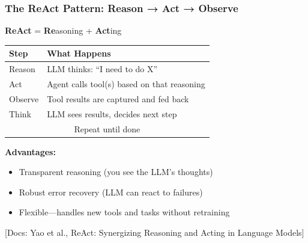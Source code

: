 \documentclass[aspectratio=169,11pt]{beamer}
\newcommand{\docref}[1]{{\scriptsize\color{docgray}[Docs: #1]}}
\begin{document}
\begin{frame}
\frametitle{The ReAct Pattern: Reason → Act → Observe}

\textbf{ReAct} = \textbf{Re}asoning + \textbf{Act}ing

\vspace{0.5cm}

\begin{center}
\begin{tabular}{ll}
\toprule
\textbf{Step} & \textbf{What Happens} \\
\midrule
Reason & LLM thinks: ``I need to do X'' \\
Act & Agent calls tool(s) based on that reasoning \\
Observe & Tool results are captured and fed back \\
Think & LLM sees results, decides next step \\
\midrule
\multicolumn{2}{c}{Repeat until done} \\
\bottomrule
\end{tabular}
\end{center}

\vspace{0.5cm}

\textbf{Advantages:}
\begin{itemize}
  \item Transparent reasoning (you see the LLM's thoughts)
  \item Robust error recovery (LLM can react to failures)
  \item Flexible—handles new tools and tasks without retraining
\end{itemize}

\docref{Yao et al., ReAct: Synergizing Reasoning and Acting in Language Models}

\end{frame}
\end{document}

